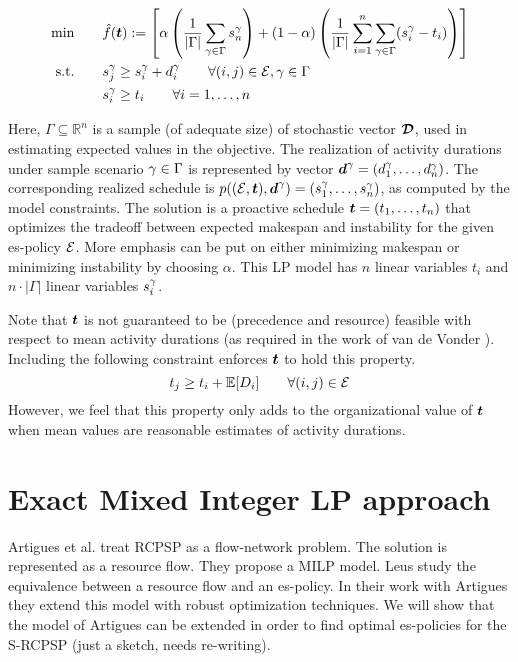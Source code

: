   	\begin{align}
 		\min \qquad & \hat{f}(\boldsymbol{t}) := \left[ 
 			\alpha  \left( \frac{1}{|\Gamma|} \sum_{\gamma \in \Gamma} s^{\gamma}_n \right) +
 			(1-\alpha)  \left( \frac{1}{|\Gamma|} \sum_{i=1}^{n}  \sum_{\gamma \in \Gamma} (s^{\gamma}_i - t_i) \right)
 			\right] \\
 		\textrm{s.t.} \qquad & s^{\gamma}_j \geq s^{\gamma}_i + d^{\gamma}_i \qquad \forall (i,j) \in \mathcal{E}, \gamma \in \Gamma \\
 							 & s^{\gamma}_i \geq t_i \qquad \forall i=1,\ldots,n
 	\end{align}
  	
 	Here, $\Gamma \subseteq \mathbb{R}^n$ is a sample (of adequate size) of stochastic vector $\boldsymbol{\mathcal{D}}$,
 	used in estimating expected values in the objective.
 	The realization of activity durations under sample scenario $\gamma \in \Gamma$ 
 	is represented by vector $\boldsymbol{d}^{\gamma} = (d^{\gamma}_1, \ldots, d^{\gamma}_n)$.
 	The corresponding realized schedule is $p((\mathcal{E},\boldsymbol{t}),\boldsymbol{d}^{\gamma}) = (s^{\gamma}_1, \ldots, s^{\gamma}_n)$,
 	as computed by the model constraints.
 	The solution is a proactive schedule $\boldsymbol{t}=(t_1,\ldots,t_n)$ that optimizes the tradeoff between
 	expected makespan and instability for the given es-policy $\mathcal{E}$. 
 	More emphasis can be put on either minimizing makespan or minimizing instability by choosing $\alpha$.
	This LP model has $n$ linear variables $t_i$ and $n \cdot |\Gamma|$ linear variables $s^{\gamma}_i$.
	
	Note that $\boldsymbol{t}$ is not guaranteed to be 
	(precedence and resource) feasible with respect to mean activity durations
	(as required in the work of van de Vonder \cite{van2008}).
	Including the following constraint enforces $\boldsymbol{t}$ to hold this property.
	\[
		t_j \geq t_i + \mathbb{E}[D_i] \qquad \forall (i,j) \in \mathcal{E}
	\]
	However, we feel that this property only adds to the organizational value of $\boldsymbol{t}$
	when mean values are reasonable estimates of activity durations.
	
	\section{Exact Mixed Integer LP approach}
	\label{sec-milp}
	
	Artigues et al. \cite{artigues2003insertion}
	treat RCPSP as a flow-network problem.
	The solution is represented as a resource flow.
	They propose a MILP model.
	Leus study the equivalence between a resource flow and an es-policy.
	In their work with Artigues they extend this model with robust optimization techniques.
	We will show that the model of Artigues can be extended 
	in order to find optimal es-policies for the S-RCPSP (just a sketch, needs re-writing).
	
